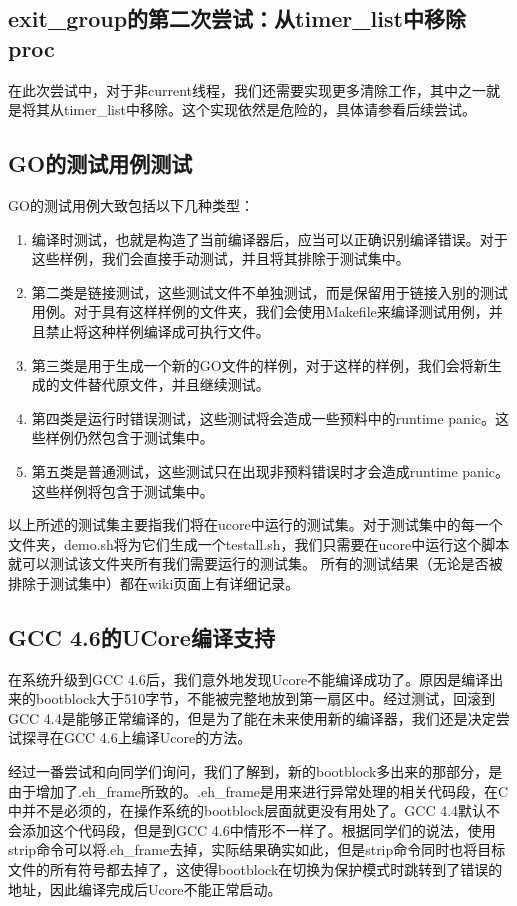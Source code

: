 \documentclass{article}
\begin{document}
\subsection{exit\_group的第二次尝试：从timer\_list中移除proc}
在此次尝试中，对于非current线程，我们还需要实现更多清除工作，其中之一就是将其从timer\_list中移除。这个实现依然是危险的，具体请参看后续尝试。

\subsection{GO的测试用例测试}
GO的测试用例大致包括以下几种类型：
\begin{enumerate}
  \item 编译时测试，也就是构造了当前编译器后，应当可以正确识别编译错误。对于这些样例，我们会直接手动测试，并且将其排除于测试集中。
  \item 第二类是链接测试，这些测试文件不单独测试，而是保留用于链接入别的测试用例。对于具有这样样例的文件夹，我们会使用Makefile来编译测试用例，并且禁止将这种样例编译成可执行文件。
  \item 第三类是用于生成一个新的GO文件的样例，对于这样的样例，我们会将新生成的文件替代原文件，并且继续测试。
  \item 第四类是运行时错误测试，这些测试将会造成一些预料中的runtime panic。这些样例仍然包含于测试集中。
  \item 第五类是普通测试，这些测试只在出现非预料错误时才会造成runtime panic。这些样例将包含于测试集中。
\end{enumerate}
以上所述的测试集主要指我们将在ucore中运行的测试集。对于测试集中的每一个文件夹，demo.sh将为它们生成一个testall.sh，我们只需要在ucore中运行这个脚本就可以测试该文件夹所有我们需要运行的测试集。
所有的测试结果（无论是否被排除于测试集中）都在wiki页面上有详细记录。

\subsection{GCC 4.6的UCore编译支持}
在系统升级到GCC 4.6后，我们意外地发现Ucore不能编译成功了。原因是编译出来的bootblock大于510字节，不能被完整地放到第一扇区中。经过测试，回滚到GCC 4.4是能够正常编译的，但是为了能在未来使用新的编译器，我们还是决定尝试探寻在GCC 4.6上编译Ucore的方法。

经过一番尝试和向同学们询问，我们了解到，新的bootblock多出来的那部分，是由于增加了.eh\_frame所致的。.eh\_frame是用来进行异常处理的相关代码段，在C中并不是必须的，在操作系统的bootblock层面就更没有用处了。GCC 4.4默认不会添加这个代码段，但是到GCC 4.6中情形不一样了。根据同学们的说法，使用strip命令可以将.eh\_frame去掉，实际结果确实如此，但是strip命令同时也将目标文件的所有符号都去掉了，这使得bootblock在切换为保护模式时跳转到了错误的地址，因此编译完成后Ucore不能正常启动。
\end{document}
